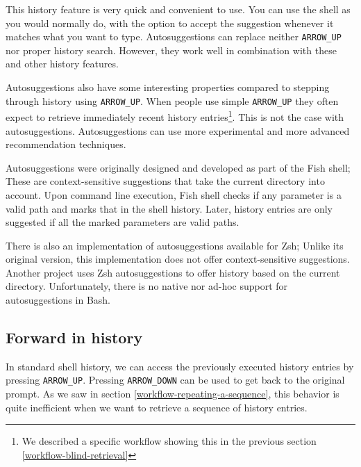 This history feature is very quick and convenient to use. You can use the shell as you would normally do, with the option to accept the suggestion whenever it matches what you want to type. Autosuggestions can replace neither \verb|ARROW_UP| nor proper history search. However, they work well in combination with these and other history features.

Autosuggestions also have some interesting properties compared to stepping through history using \verb|ARROW_UP|.
When people use simple \verb|ARROW_UP| they often expect to retrieve immediately recent history entries\footnote{We described a specific workflow showing this in the previous section \ref{workflow-blind-retrieval}}. This is not the case with autosuggestions. %
Autosuggestions can use more experimental and more advanced recommendation techniques.

Autosuggestions were originally designed and developed as part of the Fish\cite{fishdocs} shell; These are context-sensitive suggestions that take the current directory into account. Upon command line execution, Fish shell checks if any parameter is a valid path and marks that in the shell history. Later, history entries are only suggested if all the marked parameters are valid paths\cite{toolsfishissueautosuggestions}.

There is also an implementation of autosuggestions available for Zsh\cite{toolszshautosuggestions}; Unlike its original version, this implementation does not offer context-sensitive suggestions. Another project\cite{toolszshhistdb} uses Zsh autosuggestions to offer history based on the current directory.
Unfortunately, there is no native nor ad-hoc support for autosuggestions in Bash. 



\subsection{Forward in history}

In standard shell history, we can access the previously executed history entries by pressing \verb|ARROW_UP|. Pressing \verb|ARROW_DOWN| can be used to get back to the original prompt.
As we saw in section \ref{workflow-repeating-a-sequence}, this behavior is quite inefficient when we want to retrieve a sequence of history entries.

